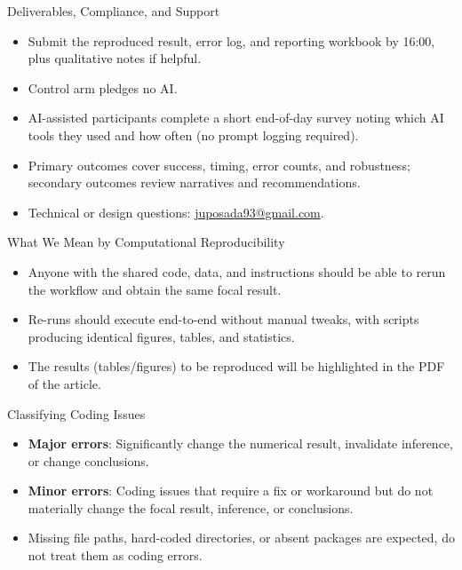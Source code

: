 \documentclass[aspectratio=169,professionalfonts]{beamer}
\begin{document}
\begin{frame}{Deliverables, Compliance, and Support}
  \begin{itemize}
    \item Submit the reproduced result, error log, and reporting workbook by 16:00, plus qualitative notes if helpful.
    \item Control arm pledges no AI.
    \item AI-assisted participants complete a short end-of-day survey noting which AI tools they used and how often (no prompt logging required).
    \item Primary outcomes cover success, timing, error counts, and robustness; secondary outcomes review narratives and recommendations.
    \item Technical or design questions: \href{mailto:juposada93@gmail.com}{juposada93@gmail.com}.
  \end{itemize}
\end{frame}

\begin{frame}{What We Mean by Computational Reproducibility}
  \begin{itemize}
    \item Anyone with the shared code, data, and instructions should be able to rerun the workflow and obtain the same focal result.
    \item Re-runs should execute end-to-end without manual tweaks, with scripts producing identical figures, tables, and statistics.
    \item The results (tables/figures) to be reproduced will be highlighted in the PDF of the article.
  \end{itemize}
\end{frame}

\begin{frame}{Classifying Coding Issues}
  \begin{itemize}
    \item \textbf{Major errors}: Significantly change the numerical result, invalidate inference, or change conclusions.
    \item \textbf{Minor errors}: Coding issues that require a fix or workaround but do not materially change the focal result, inference, or conclusions.
    \item Missing file paths, hard-coded directories, or absent packages are expected, do not treat them as coding errors.
  \end{itemize}
\end{frame}
\end{document}
